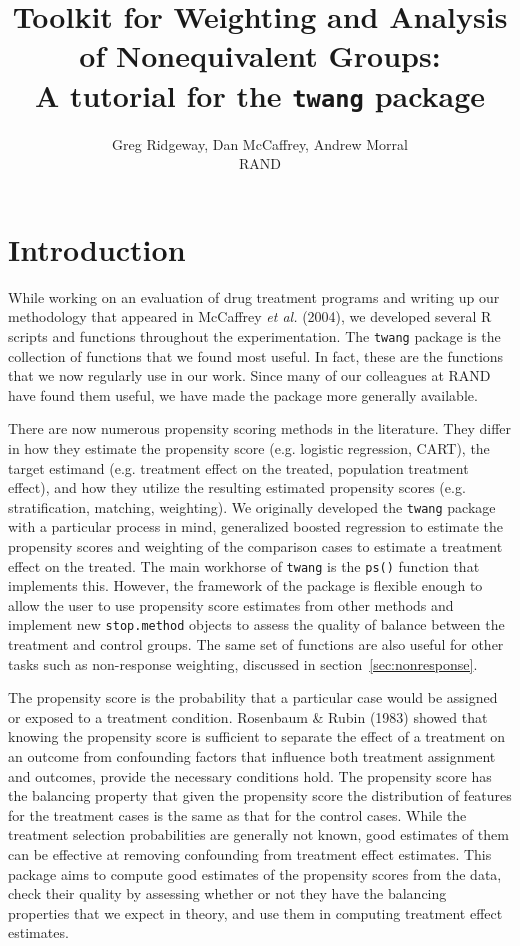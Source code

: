 \documentclass{article}
\title{Toolkit for Weighting and Analysis of Nonequivalent Groups:\\A
tutorial for the \texttt{twang} package}
\author{Greg Ridgeway, Dan McCaffrey, Andrew Morral\\RAND}
\begin{document}
\maketitle

\section{Introduction}

While working on an evaluation of drug treatment programs and writing up our
methodology that appeared in McCaffrey \textit{et al.} (2004), we developed
several R scripts and functions throughout the experimentation. The
\texttt{twang} package is the collection of functions that we found most
useful. In fact, these are the functions that we now regularly use in our work.
Since many of our colleagues at RAND have found them useful, we have made the
package more generally available.

There are now numerous propensity scoring methods in the literature. They
differ in how they estimate the propensity score (e.g. logistic regression,
CART), the target estimand (e.g. treatment effect on the treated, population
treatment effect), and how they utilize the resulting estimated propensity
scores (e.g. stratification, matching, weighting). We originally developed the
\texttt{twang} package with a particular process in mind, generalized boosted
regression to estimate the propensity scores and weighting of the comparison
cases to estimate a treatment effect on the treated. The main workhorse of
\texttt{twang} is the \texttt{ps()} function that implements this. However, the
framework of the package is flexible enough to allow the user to use propensity
score estimates from other methods and implement new \texttt{stop.method}
objects to assess the quality of balance between the treatment and control
groups. The same set of functions are also useful for other tasks such as
non-response weighting, discussed in section~\ref{sec:nonresponse}.

The propensity score is the probability that a particular case would be
assigned or exposed to a treatment condition. Rosenbaum \& Rubin (1983) showed
that knowing the propensity score is sufficient to separate the effect of a
treatment on an outcome from confounding factors that influence both treatment
assignment and outcomes, provide the necessary conditions hold. The propensity score has the balancing property that
given the propensity score the distribution of features for the treatment cases
is the same as that for the control cases. While the treatment selection
probabilities are generally not known, good estimates of them can be effective
at removing confounding from treatment effect estimates. This package aims to
compute good estimates of the propensity scores from the data, check their
quality by assessing whether or not they have the balancing properties that we
expect in theory, and use them in computing treatment effect estimates.
\end{document}
